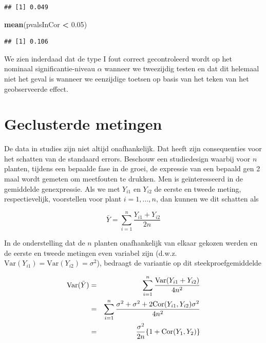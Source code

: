 \documentclass[
  12pt,dutch]{book}
\newenvironment{Shaded}{\begin{snugshade}}{\end{snugshade}}
\newcommand{\FloatTok}[1]{\textcolor[rgb]{0.00,0.00,0.81}{#1}}
\newcommand{\FunctionTok}[1]{\textcolor[rgb]{0.13,0.29,0.53}{\textbf{#1}}}
\newcommand{\NormalTok}[1]{#1}
\newcommand{\SpecialCharTok}[1]{\textcolor[rgb]{0.81,0.36,0.00}{\textbf{#1}}}
\theoremstyle{definition}
\theoremstyle{definition}
\theoremstyle{definition}
\theoremstyle{definition}
\theoremstyle{remark}
\begin{document}
\begin{verbatim}
## [1] 0.049
\end{verbatim}

\begin{Shaded}
\begin{Highlighting}[]
\FunctionTok{mean}\NormalTok{(pvalsInCor }\SpecialCharTok{\textless{}} \FloatTok{0.05}\NormalTok{)}
\end{Highlighting}
\end{Shaded}

\begin{verbatim}
## [1] 0.106
\end{verbatim}

We zien inderdaad dat de type I fout correct gecontroleerd wordt op het nominaal significantie-niveau \(\alpha\) wanneer we tweezijdig testen en dat dit helemaal niet het geval is wanneer we eenzijdige toetsen op basis van het teken van het geobserveerde effect.

\section{Geclusterde metingen}\label{geclusterde-metingen}

De data in studies zijn niet altijd onafhankelijk. Dat heeft zijn consequenties voor het schatten van de standaard errors.
Beschouw een studiedesign waarbij voor \(n\) planten, tijdens een bepaalde fase in de groei, de expressie van een bepaald gen 2 maal wordt gemeten om meetfouten te drukken. Men is geïnteresseerd in de gemiddelde genexpressie.
Als we met \(Y_{i1}\) en \(Y_{i2}\) de eerste en tweede meting, respectievelijk, voorstellen
voor plant \(i=1,...,n\), dan kunnen we dit schatten als

\begin{equation*}
\bar Y = \sum_{i=1}^n \frac{Y_{i1}+Y_{i2}}{2n}
\end{equation*}

In de onderstelling dat de \(n\) planten onafhankelijk van elkaar gekozen
werden en de eerste en tweede metingen even variabel zijn (d.w.z. \(\text{Var}(Y_{i1})=\text{Var}(Y_{i2})=\sigma^2\)), bedraagt de variantie op dit
steekproefgemiddelde

\begin{eqnarray*}
\text{Var}(\bar Y)&=&\sum_{i=1}^n \frac{\text{Var}(Y_{i1}+Y_{i2})}{4n^2} \\
&=&\sum_{i=1}^n \frac{\sigma^2+\sigma^2+2\text{Cor}(Y_{i1},Y_{i2})\sigma^2}{%
4n^2} \\
&=&\frac{\sigma^2}{2n}\{1+\text{Cor}(Y_{1},Y_{2})\}
\end{eqnarray*}
\end{document}
